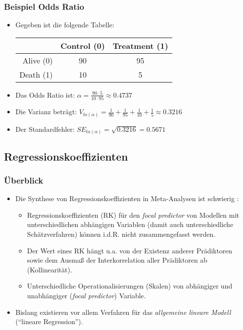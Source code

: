 \begin{frame}\frametitle{Beispiel Odds Ratio}
  \begin{itemize}
  \item Gegeben ist die folgende Tabelle:
    \begin{center}
      \begin{tabular}{|r|c|c|}
        \hline
        & Control (0) & Treatment (1) \\
        \hline
        Alive (0) & 90    & 95    \\
        Death (1) & 10    & 5     \\
        \hline
      \end{tabular}
    \end{center}
  \item Das Odds Ratio ist: $\alpha = \frac{90 \cdot 5}{10 \cdot 95} \approx 0.4737$
  \item Die Varianz beträgt: $V_{ln(\alpha)}= \frac{1}{90} + \frac{1}{95} + \frac{1}{10} + \frac{1}{5} \approx 0.3216$
  \item Der Standardfehler: $SE_{ln(\alpha)} = \sqrt{0.3216} = 0.5671$
  \end{itemize}
\end{frame}



\subsection{Regressionskoeffizienten}

\begin{frame}\frametitle{Überblick}

  \begin{itemize}
  \item Die Synthese von Regressionskoeffizienten in Meta-Analysen ist schwierig \citep[333ff.]{aloe_advances_2011}: 
    \begin{itemize}
    \item Regressionskoeffizienten (RK) für den \emph{focal predictor} von Modellen mit unterschiedlichen abhängigen
      Variablen (damit auch unterschiedliche Schätzverfahren) können i.d.R. nicht zusammengefasst werden.
    \item Der Wert eines RK hängt u.a. von der Existenz anderer Prädiktoren
      sowie dem Ausmaß der Interkorrelation aller Prädiktoren ab (Kollinearität).
    \item Unterschiedliche Operationalisierungen (Skalen) von abhängiger und unabhängiger (\emph{focal predictor}) Variable.    \end{itemize}
  \item Bislang existieren vor allem Verfahren für das \emph{allgemeine lineare Modell} ("`lineare Regression"').
  \end{itemize}   
\end{frame}



